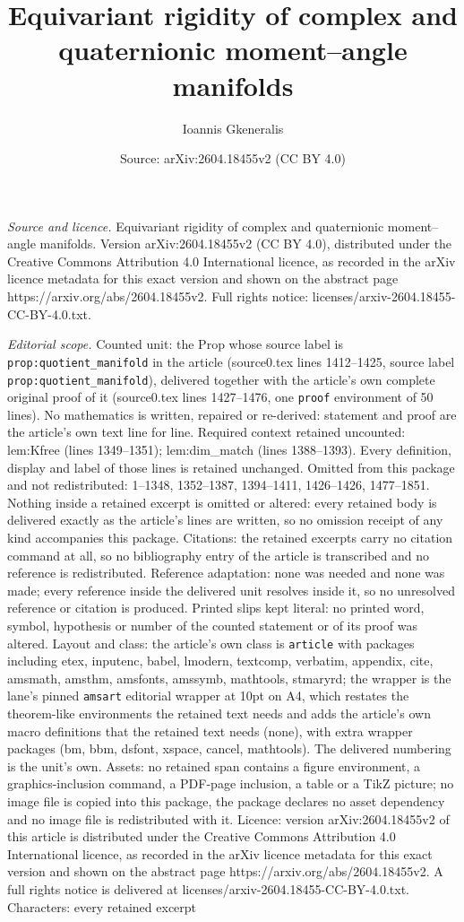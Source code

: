\documentclass[10pt,a4paper]{amsart}
\title[Equivariant rigidity of complex and quaternionic moment--ang]{Equivariant rigidity of complex and quaternionic moment--angle manifolds}
\author{Ioannis Gkeneralis}
\date{Source: arXiv:2604.18455v2 (CC BY 4.0)}
\begin{document}
\maketitle

\noindent\emph{Source and licence.} Equivariant rigidity of complex and quaternionic moment--angle manifolds. Version arXiv:2604.18455v2 (CC BY 4.0), distributed under the Creative Commons Attribution 4.0 International licence, as recorded in the arXiv licence metadata for this exact version and shown on the abstract page https://arxiv.org/abs/2604.18455v2. Full rights notice: licenses/arxiv-2604.18455-CC-BY-4.0.txt.\par\smallskip

\noindent\textit{Editorial scope.} Counted unit: the Prop whose source label is \texttt{prop:quotient\_manifold} in the article (source0.tex lines 1412--1425, source label \texttt{prop:quotient\_manifold}), delivered together with the article's own complete original proof of it (source0.tex lines 1427--1476, one \texttt{proof} environment of 50 lines). No mathematics is written, repaired or re-derived: statement and proof are the article's own text line for line. Required context retained uncounted: lem:Kfree (lines 1349--1351); lem:dim\_match (lines 1388--1393). Every definition, display and label of those lines is retained unchanged. Omitted from this package and not redistributed: 1--1348, 1352--1387, 1394--1411, 1426--1426, 1477--1851. Nothing inside a retained excerpt is omitted or altered: every retained body is delivered exactly as the article's lines are written, so no omission receipt of any kind accompanies this package. Citations: the retained excerpts carry no citation command at all, so no bibliography entry of the article is transcribed and no reference is redistributed. Reference adaptation: none was needed and none was made; every reference inside the delivered unit resolves inside it, so no unresolved reference or citation is produced. Printed slips kept literal: no printed word, symbol, hypothesis or number of the counted statement or of its proof was altered. Layout and class: the article's own class is \texttt{article} with packages including etex, inputenc, babel, lmodern, textcomp, verbatim, appendix, cite, amsmath, amsthm, amsfonts, amssymb, mathtools, stmaryrd; the wrapper is the lane's pinned \texttt{amsart} editorial wrapper at 10pt on A4, which restates the theorem-like environments the retained text needs and adds the article's own macro definitions that the retained text needs (none), with extra wrapper packages (bm, bbm, dsfont, xspace, cancel, mathtools). The delivered numbering is the unit's own. Assets: no retained span contains a figure environment, a graphics-inclusion command, a PDF-page inclusion, a table or a TikZ picture; no image file is copied into this package, the package declares no asset dependency and no image file is redistributed with it. Licence: version arXiv:2604.18455v2 of this article is distributed under the Creative Commons Attribution 4.0 International licence, as recorded in the arXiv licence metadata for this exact version and shown on the abstract page https://arxiv.org/abs/2604.18455v2. A full rights notice is delivered at licenses/arxiv-2604.18455-CC-BY-4.0.txt. Characters: every retained excerpt 
\end{document}
